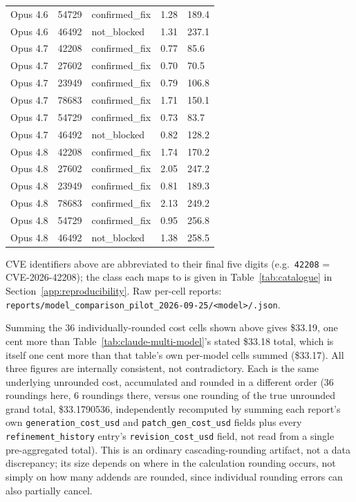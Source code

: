 \documentclass[12pt,a4paper]{report}
\begin{document}
\begin{longtable}{@{}p{2.2cm}p{1.3cm}p{3cm}p{1.5cm}p{1.5cm}@{}}
Opus 4.6 & 54729 & confirmed\_fix & 1.28 & 189.4 \\
Opus 4.6 & 46492 & not\_blocked & 1.31 & 237.1 \\
\midrule
Opus 4.7 & 42208 & confirmed\_fix & 0.77 & 85.6 \\
Opus 4.7 & 27602 & confirmed\_fix & 0.70 & 70.5 \\
Opus 4.7 & 23949 & confirmed\_fix & 0.79 & 106.8 \\
Opus 4.7 & 78683 & confirmed\_fix & 1.71 & 150.1 \\
Opus 4.7 & 54729 & confirmed\_fix & 0.73 & 83.7 \\
Opus 4.7 & 46492 & not\_blocked & 0.82 & 128.2 \\
\midrule
Opus 4.8 & 42208 & confirmed\_fix & 1.74 & 170.2 \\
Opus 4.8 & 27602 & confirmed\_fix & 2.05 & 247.2 \\
Opus 4.8 & 23949 & confirmed\_fix & 0.81 & 189.3 \\
Opus 4.8 & 78683 & confirmed\_fix & 2.13 & 249.2 \\
Opus 4.8 & 54729 & confirmed\_fix & 0.95 & 256.8 \\
Opus 4.8 & 46492 & not\_blocked & 1.38 & 258.5 \\
\bottomrule
\end{longtable}

CVE identifiers above are abbreviated to their final five digits (e.g.\ \texttt{42208} = CVE-2026-42208); the class each maps to is given in Table~\ref{tab:catalogue} in Section~\ref{app:reproducibility}. Raw per-cell reports: \texttt{reports/\allowbreak model\_comparison\_\allowbreak pilot\_2026-09-25/\allowbreak <model>/.json}.

Summing the 36 individually-rounded cost cells shown above gives \$33.19, one cent more than Table~\ref{tab:claude-multi-model}'s stated \$33.18 total, which is itself one cent more than that table's own per-model cells summed (\$33.17). All three figures are internally consistent, not contradictory. Each is the same underlying unrounded cost, accumulated and rounded in a different order (36 roundings here, 6 roundings there, versus one rounding of the true unrounded grand total, \$33.1790536, independently recomputed by summing each report's own \texttt{generation\_cost\_usd} and \texttt{patch\_gen\_cost\_usd} fields plus every \texttt{refinement\_history} entry's \texttt{revision\_cost\_usd} field, not read from a single pre-aggregated total). This is an ordinary cascading-rounding artifact, not a data discrepancy; its size depends on where in the calculation rounding occurs, not simply on how many addends are rounded, since individual rounding errors can also partially cancel.
\end{document}
